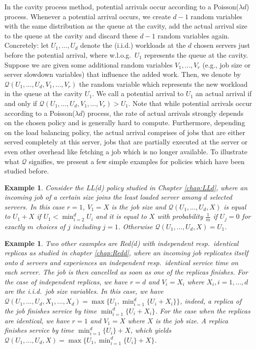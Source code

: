\documentclass[12pt]{report}
\newcommand{\QQ}{\mathcal{Q}}
\newtheorem{vbd}[theorem]{Example}
\begin{document}
In the cavity process method, potential arrivals occur according to a Poisson($\lambda d$) process. Whenever a potential arrival occurs, we create $d-1$ random variables with the same distribution as the queue at the cavity, add the actual arrival size to the queue at the cavity and discard these $d-1$ random variables again. Concretely: let $U_1,\dots, U_d$ denote the (i.i.d.) workloads at the $d$ chosen servers just before the potential arrival, where w.l.o.g.~$U_1$ represents the queue at the cavity. Suppose we are given some additional random variables $V_1,\dots,V_r$ (e.g., job size or server slowdown variables) that influence the added work. Then, we denote by $\mathcal{Q}(U_1,\dots,U_d,V_1,\dots,V_r)$ the random variable which represents the new workload in the queue at the cavity $U_1$. We call a potential arrival to $U_1$ an actual arrival if and only if $\mathcal{Q}(U_1,\dots,U_d,V_1,\dots,V_r) > U_1$. Note that while potential arrivals occur according to a Poisson($\lambda d$) process, the rate of actual arrivals strongly depends on the chosen policy and is generally hard to compute. Furthermore, depending on the load balancing policy, the actual arrival comprises of jobs that are either served completely at this server, jobs that are  partially executed at the server or even other overhead like fetching a job which is no longer available. To illustrate what $\QQ$ signifies, we present a few simple examples 
for policies which have been studied before.
\begin{vbd}
Consider the LL($d$) policy studied in Chapter \ref{chap:LLd}, where an incoming job of a certain size joins the least loaded server among $d$ selected servers. In this case $r=1$, $V_1=X$ is the job size and $\mathcal{Q}(U_1,\dots, U_d, X)$ is equal to $U_1+X$ if $U_1 < \min_{i=2}^d U_i$ and it is equal to $X$ with probability $\frac{1}{m}$ if $U_j=0$ for exactly $m$ choices of $j$ including $j=1$. Otherwise $\mathcal{Q}(U_1,\dots, U_d,X)=U_1$.
\end{vbd}
\begin{vbd}
Two other examples are Red($d$) with independent resp.~identical replicas as studied in chapter \ref{chap:Redd}, where an incoming job replicates itself onto $d$ servers and experiences an independent resp.~identical service time on each server. The job is then cancelled as soon as one of the replicas finishes. For the case of independent replicas, we have $r=d$ and $V_i=X_i$ where $X_i, i=1,\dots,d$ are the i.i.d.~job size variables. In this case, we have $\mathcal{Q}(U_1,\dots,U_d,X_1,\dots,X_d)=\max\{U_1,\min_{i=1}^d\{U_i + X_i\}\}$, indeed, a replica
of the job finishes service by time $\min_{i=1}^d\{U_i + X_i\}$. For the case when the replicas are identical, we have $r=1$ and $V_1=X$ where $X$ is the job size. A replica finishes service by time $\min_{i=1}^d \{U_i\} + X$, which yields $\mathcal{Q}(U_1,\dots,U_d,X) = \max\{U_1, \min_{i=1}^d \{U_i\} + X  \}$.
\end{vbd}
\end{document}
